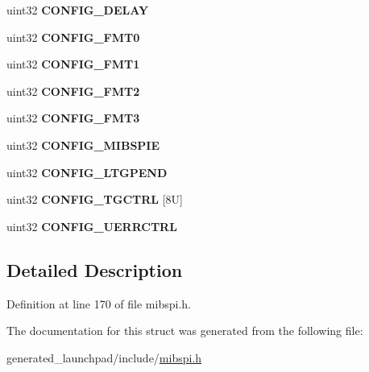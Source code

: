 \begin{DoxyCompactItemize}
\item 
\mbox{\label{structmibspi__config__reg_a646a14383acb9138052c283660c30be6}} 
uint32 {\bfseries C\+O\+N\+F\+I\+G\+\_\+\+D\+E\+L\+AY}
\item 
\mbox{\label{structmibspi__config__reg_aab0ea9aa5396e9b951fe592ceadb83a7}} 
uint32 {\bfseries C\+O\+N\+F\+I\+G\+\_\+\+F\+M\+T0}
\item 
\mbox{\label{structmibspi__config__reg_a96dfea7ddc7eae63d88e1b0ecd0f600e}} 
uint32 {\bfseries C\+O\+N\+F\+I\+G\+\_\+\+F\+M\+T1}
\item 
\mbox{\label{structmibspi__config__reg_ad0d87e26a5f5e02787d44bdd4b0b5b6a}} 
uint32 {\bfseries C\+O\+N\+F\+I\+G\+\_\+\+F\+M\+T2}
\item 
\mbox{\label{structmibspi__config__reg_a7599845af3ec63631584cf23a8c927d6}} 
uint32 {\bfseries C\+O\+N\+F\+I\+G\+\_\+\+F\+M\+T3}
\item 
\mbox{\label{structmibspi__config__reg_abd25d5443ceb6b317e196dcc5e5408a4}} 
uint32 {\bfseries C\+O\+N\+F\+I\+G\+\_\+\+M\+I\+B\+S\+P\+IE}
\item 
\mbox{\label{structmibspi__config__reg_ad4ba51b1209e6f51f4a81be974e629bb}} 
uint32 {\bfseries C\+O\+N\+F\+I\+G\+\_\+\+L\+T\+G\+P\+E\+ND}
\item 
\mbox{\label{structmibspi__config__reg_a07facfbac238876786b48e65b02e5164}} 
uint32 {\bfseries C\+O\+N\+F\+I\+G\+\_\+\+T\+G\+C\+T\+RL} \mbox{[}8\+U\mbox{]}
\item 
\mbox{\label{structmibspi__config__reg_aad60a977f83116c8bd90a2fc447a85d2}} 
uint32 {\bfseries C\+O\+N\+F\+I\+G\+\_\+\+U\+E\+R\+R\+C\+T\+RL}
\end{DoxyCompactItemize}


\subsection{Detailed Description}


Definition at line 170 of file mibspi.\+h.



The documentation for this struct was generated from the following file\+:\begin{DoxyCompactItemize}
\item 
generated\+\_\+launchpad/include/\mbox{\hyperlink{mibspi_8h}{mibspi.\+h}}\end{DoxyCompactItemize}
